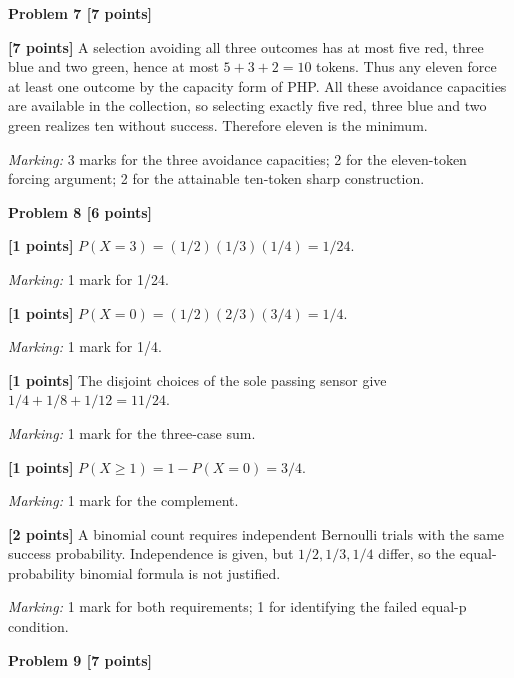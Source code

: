 \documentclass[12pt,letterpaper]{article}
\newcommand{\problemheading}[2][5\baselineskip]{\Needspace{#1}\par\noindent\hspace*{-0.625in}\textbf{#2}\par\nobreak\vspace{0.3em}}
\begin{document}
\problemheading[\dimexpr 3\baselineskip+4\baselineskip\relax]{Problem 7 [7 points]}
\begin{description}[font=\normalfont,leftmargin=1.2em,labelsep=0.4em]
\item[] \textbf{[7 points]} A selection avoiding all three outcomes has at most five red, three blue and two green, hence at most $5+3+2=10$ tokens. Thus any eleven force at least one outcome by the capacity form of PHP. All these avoidance capacities are available in the collection, so selecting exactly five red, three blue and two green realizes ten without success. Therefore eleven is the minimum.
\par\textit{Marking:} 3 marks for the three avoidance capacities; 2 for the eleven-token forcing argument; 2 for the attainable ten-token sharp construction.
\end{description}
\vspace{0.65em}
\problemheading[\dimexpr 3\baselineskip+4\baselineskip\relax]{Problem 8 [6 points]}
\begin{description}[font=\normalfont,leftmargin=1.2em,labelsep=0.4em]
\item[(a)] \textbf{[1 points]} $P(X=3)=(1/2)(1/3)(1/4)=1/24$.
\par\textit{Marking:} 1 mark for 1/24.
\item[(b)] \textbf{[1 points]} $P(X=0)=(1/2)(2/3)(3/4)=1/4$.
\par\textit{Marking:} 1 mark for 1/4.
\item[(c)] \textbf{[1 points]} The disjoint choices of the sole passing sensor give $1/4+1/8+1/12=11/24$.
\par\textit{Marking:} 1 mark for the three-case sum.
\item[(d)] \textbf{[1 points]} $P(X\ge1)=1-P(X=0)=3/4$.
\par\textit{Marking:} 1 mark for the complement.
\item[(e)] \textbf{[2 points]} A binomial count requires independent Bernoulli trials with the same success probability. Independence is given, but $1/2,1/3,1/4$ differ, so the equal-probability binomial formula is not justified.
\par\textit{Marking:} 1 mark for both requirements; 1 for identifying the failed equal-p condition.
\end{description}
\vspace{0.65em}
\problemheading[\dimexpr 3\baselineskip+4\baselineskip\relax]{Problem 9 [7 points]}
\end{document}
